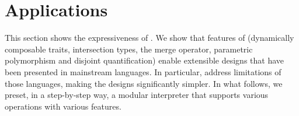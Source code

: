 \section{Applications}



This section shows the expressiveness of \name. We show that features of \name
(dynamically composable traits, intersection types, the merge operator,
parametric polymorphism and disjoint quantification) enable extensible designs
that have been presented in mainstream languages. In particular, \name address
limitations of those languages, making the designs significantly simpler. In
what follows, we preset, in a step-by-step way, a modular interpreter that
supports various operations with various features.
